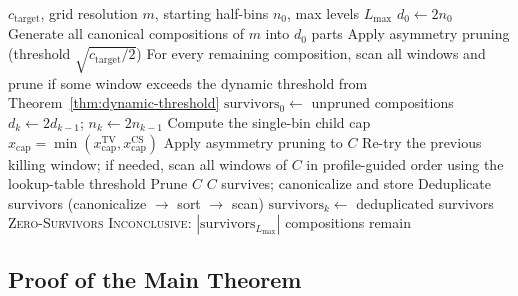 \documentclass[11pt, letterpaper]{article}
\theoremstyle{paperplain}
\theoremstyle{paperdef}
\begin{document}
\begin{algorithm}[H]
\caption{Cascade Search For Terminal Coverage}
\label{alg:cascade}
\begin{algorithmic}[1]
\Require $c_{\mathrm{target}}$, grid resolution $m$, starting half-bins
  $n_0$, max levels $L_{\max}$
\State $d_0 \gets 2 n_0$
\State Generate all canonical compositions of $m$ into $d_0$ parts
\State Apply asymmetry pruning (threshold
  $\sqrt{c_{\mathrm{target}}/2}$)
\State For every remaining composition, scan all windows and prune if
  some window exceeds the dynamic threshold from
  Theorem~\ref{thm:dynamic-threshold}
\State $\text{survivors}_0 \gets$ unpruned compositions
  \State $d_k \gets 2 d_{k-1}$; \quad
    $n_k \gets 2 n_{k-1}$
  \State Compute the single-bin child cap
    $x_{\mathrm{cap}} = \min(x_{\mathrm{cap}}^{\mathrm{TV}},
    x_{\mathrm{cap}}^{\mathrm{CS}})$
      \State Apply asymmetry pruning to $C$
        \State Re-try the previous killing window; if needed, scan all windows of $C$ in profile-guided order using the lookup-table threshold
          \State Prune $C$
        \Else
          \State $C$ survives; canonicalize and store
        \EndIf
      \EndIf
    \EndFor
  \EndFor
  \State Deduplicate survivors (canonicalize $\to$ sort $\to$ scan)
  \State $\text{survivors}_k \gets$ deduplicated survivors
    \State \Return \textsc{Zero-Survivors}
  \EndIf
\EndFor
\State \Return \textsc{Inconclusive}:
  $|\text{survivors}_{L_{\max}}|$ compositions remain
\end{algorithmic}
\end{algorithm}

\subsection{Proof of the Main Theorem}
\end{document}
